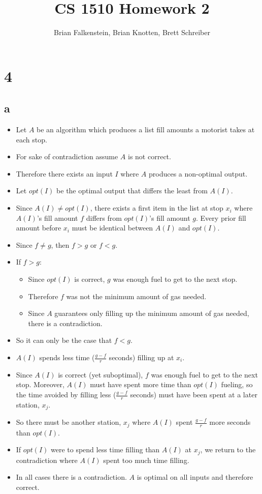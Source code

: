 \documentclass[letterpaper,notitlepage,twoside]{article}
\title{CS 1510 Homework 2}
\author{Brian Falkenstein, Brian Knotten, Brett Schreiber}
\begin{document}
\maketitle

\section*{4}
\subsection*{a}
\begin{itemize}
	\item Let $A$ be an algorithm which produces a list fill amounts a motorist takes at each stop. 
	\item For sake of contradiction assume $A$ is not correct.
	\item Therefore there exists an input $I$ where $A$ produces a non-optimal output.
	\item Let $opt(I)$ be the optimal output that differs the least from $A(I)$.
	\item Since $A(I) \neq opt(I)$, there exists a first item in the list at stop $x_i$ where $A(I)$'s fill amount $f$ differs from $opt(I)$'s fill amount $g$. Every prior fill amount before $x_i$ must be identical between $A(I)$ and $opt(I)$.
	\item Since $f \neq g$, then $f > g$ or $f < g$.
	\item If $f > g$:
	\begin{itemize}
		\item Since $opt(I)$ is correct, $g$ was enough fuel to get to the next stop.
		\item Therefore $f$ was not the minimum amount of gas needed.
		\item Since $A$ guarantees only filling up the minimum amount of gas needed, there is a contradiction.
	\end{itemize}
	
	\item So it can only be the case that $f < g$.
	\item $A(I)$ spends less time ($\frac{g - f}{r}$ seconds) filling up at $x_i$.
	\item Since $A(I)$ is correct (yet suboptimal), $f$ was enough fuel to get to the next stop. Moreover, $A(I)$ must have spent more time than $opt(I)$ fueling, so the time avoided by filling less ($\frac{g - f}{r}$ seconds) must have been spent at a later station, $x_j$.
	\item So there must be another station, $x_j$ where $A(I)$ spent $\frac{g - f}{r}$ more seconds than $opt(I)$.
	\item If $opt(I)$ were to spend less time filling than $A(I)$ at $x_j$, we return to the contradiction where $A(I)$ spent too much time filling.
	\item In all cases there is a contradiction. $A$ is optimal on all inputs and therefore correct.
\end{itemize}
\end{document}
